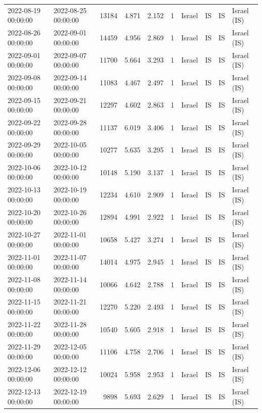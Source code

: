 \begin{tabular}{llrrrlllll}
2022-08-19 00:00:00 & 2022-08-25 00:00:00 & 13184 & 4.871 & 2.152 & 1 & Israel & IS & IS & Israel (IS) \\
2022-08-26 00:00:00 & 2022-09-01 00:00:00 & 14459 & 4.956 & 2.869 & 1 & Israel & IS & IS & Israel (IS) \\
2022-09-01 00:00:00 & 2022-09-07 00:00:00 & 11700 & 5.664 & 3.293 & 1 & Israel & IS & IS & Israel (IS) \\
2022-09-08 00:00:00 & 2022-09-14 00:00:00 & 11083 & 4.467 & 2.497 & 1 & Israel & IS & IS & Israel (IS) \\
2022-09-15 00:00:00 & 2022-09-21 00:00:00 & 12297 & 4.602 & 2.863 & 1 & Israel & IS & IS & Israel (IS) \\
2022-09-22 00:00:00 & 2022-09-28 00:00:00 & 11137 & 6.019 & 3.406 & 1 & Israel & IS & IS & Israel (IS) \\
2022-09-29 00:00:00 & 2022-10-05 00:00:00 & 10277 & 5.635 & 3.295 & 1 & Israel & IS & IS & Israel (IS) \\
2022-10-06 00:00:00 & 2022-10-12 00:00:00 & 10148 & 5.190 & 3.137 & 1 & Israel & IS & IS & Israel (IS) \\
2022-10-13 00:00:00 & 2022-10-19 00:00:00 & 12234 & 4.610 & 2.909 & 1 & Israel & IS & IS & Israel (IS) \\
2022-10-20 00:00:00 & 2022-10-26 00:00:00 & 12894 & 4.991 & 2.922 & 1 & Israel & IS & IS & Israel (IS) \\
2022-10-27 00:00:00 & 2022-11-01 00:00:00 & 10658 & 5.427 & 3.274 & 1 & Israel & IS & IS & Israel (IS) \\
2022-11-01 00:00:00 & 2022-11-07 00:00:00 & 14014 & 4.975 & 2.945 & 1 & Israel & IS & IS & Israel (IS) \\
2022-11-08 00:00:00 & 2022-11-14 00:00:00 & 10066 & 4.642 & 2.788 & 1 & Israel & IS & IS & Israel (IS) \\
2022-11-15 00:00:00 & 2022-11-21 00:00:00 & 12270 & 5.220 & 2.493 & 1 & Israel & IS & IS & Israel (IS) \\
2022-11-22 00:00:00 & 2022-11-28 00:00:00 & 10540 & 5.605 & 2.918 & 1 & Israel & IS & IS & Israel (IS) \\
2022-11-29 00:00:00 & 2022-12-05 00:00:00 & 11106 & 4.758 & 2.706 & 1 & Israel & IS & IS & Israel (IS) \\
2022-12-06 00:00:00 & 2022-12-12 00:00:00 & 10024 & 5.958 & 2.953 & 1 & Israel & IS & IS & Israel (IS) \\
2022-12-13 00:00:00 & 2022-12-19 00:00:00 & 9898 & 5.693 & 2.629 & 1 & Israel & IS & IS & Israel (IS) \\

\end{tabular}
